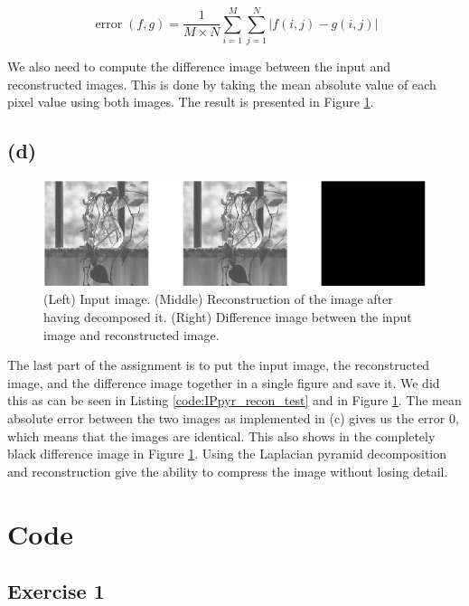 \documentclass{article}
\begin{document}
\begin{equation}\label{eq:meanabserror}
    \operatorname{error}(f, g)=\frac{1}{M \times N} \sum_{i=1}^{M} \sum_{j=1}^{N}|f(i, j)-g(i, j)|
\end{equation}

We also need to compute the difference image between the input and reconstructed images. This is done by taking the mean absolute value of each pixel value using both images. The result is presented in Figure \ref{fig:recon_all}.

\subsection*{(d)}

\begin{figure}[h]
    \centering
    \includegraphics[width=\textwidth]{Assignment_3/output_plots/IPpyr_recon_test.png}
    \caption{(Left) Input image. (Middle) Reconstruction of the image after having decomposed it. (Right) Difference image between the input image and reconstructed image.}
    \label{fig:recon_all}
\end{figure}
The last part of the assignment is to put the input image, the reconstructed image, and the difference image together in a single figure and save it. We did this as can be seen in  Listing \ref{code:IPpyr_recon_test} and in Figure \ref{fig:recon_all}. The mean absolute error between the two images as implemented in (c) gives us the error $0$, which means that the images are identical. This also shows in the completely black difference image in Figure \ref{fig:recon_all}. Using the Laplacian pyramid decomposition and reconstruction give the ability to compress the image without losing detail.


\typeout{}


\newpage
\appendix
\section{Code}
\subsection{Exercise 1}

\end{document}
